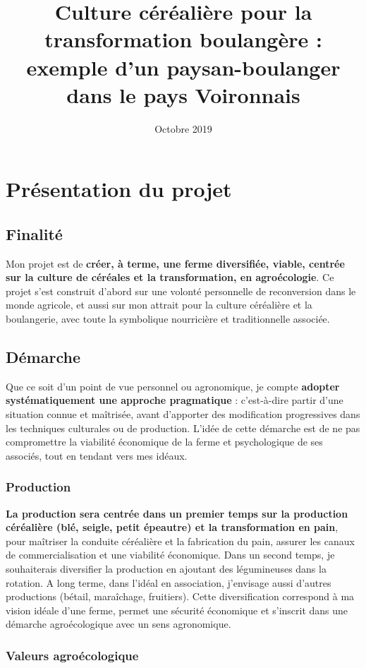 \documentclass{article}
\title{Culture céréalière pour la transformation boulangère : exemple d'un paysan-boulanger dans le pays Voironnais}
\date{Octobre 2019}
\begin{document}
\section{Présentation du projet}

\subsection*{Finalité}

Mon projet est de \textbf{créer, à terme, une ferme diversifiée, viable, centrée sur la culture de céréales et la transformation, en agroécologie}. Ce projet s'est construit d'abord sur une volonté personnelle de reconversion dans le monde agricole, et aussi sur mon attrait pour la culture céréalière et la boulangerie, avec toute la symbolique nourricière et traditionnelle associée. 

\subsection*{Démarche}

Que ce soit d'un point de vue personnel ou agronomique, je compte \textbf{adopter systématiquement une approche pragmatique} : c'est-à-dire partir d'une situation connue et maîtrisée, avant d'apporter des modification progressives dans les techniques culturales ou de production. L'idée de cette démarche est de ne pas compromettre la viabilité économique de la ferme et psychologique de ses associés, tout en tendant vers mes idéaux.

\subsubsection*{Production}

\textbf{La production sera centrée dans un premier temps sur la production céréalière (blé, seigle, petit épeautre) et la transformation en pain}, pour maîtriser la conduite céréalière et la fabrication du pain, assurer les canaux de commercialisation et une viabilité économique. Dans un second temps, je souhaiterais diversifier la production en ajoutant des légumineuses dans la rotation. A long terme, dans l'idéal en association, j'envisage aussi d'autres productions (bétail, maraîchage, fruitiers). Cette diversification correspond à ma vision idéale d'une ferme, permet une sécurité économique et s'inscrit dans une démarche agroécologique avec un sens agronomique.

\subsubsection*{Valeurs agroécologique}
\end{document}
